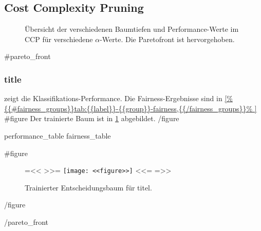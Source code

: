 \subsection{Cost Complexity Pruning}

\begin{figure}[ht]
  \centering
  \caption{Übersicht der verschiedenen Baumtiefen und Performance-Werte
    im CCP für verschiedene \(\alpha\)-Werte. Die Paretofront ist
    hervorgehoben.}
\end{figure}

{{#pareto_front}}
\clearpage
\subsubsection{ {{title}} }
 zeigt die Klassifikations-Performance.
Die Fairness-Ergebnisse sind in
\cref{%
  {{#fairness_groups}}tab:{{label}}-{{group}}-fairness,{{/fairness_groups}}%
  }
{{#figure}}
Der trainierte Baum ist in \cref{fig:{{label}}-tree} abgebildet.
{{/figure}}


{{{performance_table}}}
{{{fairness_table}}}

{{#figure}}
\begin{figure}
  {{=<< >>=}}
  \texttt{[image: <<figure>>]}
  <<={{ }}=>>
  \caption{Trainierter Entscheidungsbaum für {{titel}}.}
  \label{fig:{{label}}-tree}
\end{figure}
{{/figure}}

{{/pareto_front}}
